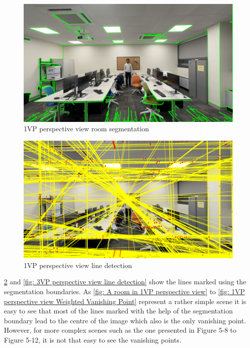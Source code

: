 \begin{figure}[H]
    \centering
    \includegraphics[width=1.0\textwidth]{1vp Segmentation Result.png}
    \caption{1VP perspective view room segmentation}
    \label{fig: 1VP perspective view room segmentation}
\end{figure}

\begin{figure}[H]
    \centering
    \includegraphics[width=1.0\textwidth]{1vp Segmentation and Corner Detection Result.png}
    \caption{1VP perspective view line detection}
    \label{fig: 1VP perspective view line detection}
\end{figure}

\ref{fig: 1VP perspective view line detection} and \ref{fig: 3VP perspective view line detection} show the lines marked using the segmentation boundaries. As \ref{fig: A room in 1VP perspective view} to \ref{fig: 1VP perspective view Weighted Vanishing Point} represent a rather simple scene it is easy to see that most of the lines marked with the help of the segmentation boundary lead to the centre of the image which also is the only vanishing point. However, for more complex scenes such as the one presented in Figure 5-8 to Figure 5-12, it is not that easy to see the vanishing points.\newline

